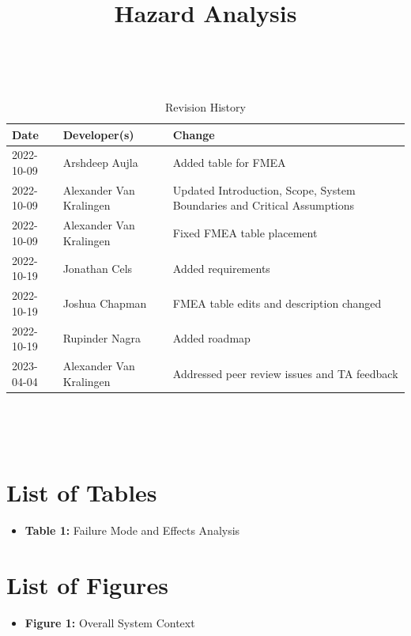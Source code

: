 \documentclass{article}
\title{Hazard Analysis\\\progname}
\author{\authname}
\date{}
\begin{document}
\maketitle
\thispagestyle{empty}

~\newpage


\begin{table}[hp]
\caption{Revision History} \label{TblRevisionHistory}
\begin{tabularx}{\textwidth}{llX}
\toprule
\textbf{Date} & \textbf{Developer(s)} & \textbf{Change}\\
\midrule
2022-10-09 & Arshdeep Aujla & Added table for FMEA\\
2022-10-09 & Alexander Van Kralingen & Updated Introduction, Scope, System Boundaries and Critical Assumptions\\
2022-10-09 & Alexander Van Kralingen & Fixed FMEA table placement\\
2022-10-19 & Jonathan Cels & Added requirements\\
2022-10-19 & Joshua Chapman & FMEA table edits and description changed\\
2022-10-19 & Rupinder Nagra & Added roadmap\\
2023-04-04 & Alexander Van Kralingen & Addressed peer review issues and TA feedback\\
\bottomrule
\end{tabularx}
\end{table}

~\newpage

\tableofcontents

~\newpage


\section{List of Tables}
\begin{itemize}
    \item \textbf{Table 1:} Failure Mode and Effects Analysis
\end{itemize}

\section{List of Figures}
\begin{itemize}
    \item \textbf{Figure 1:} Overall System Context
\end{itemize}
\end{document}
